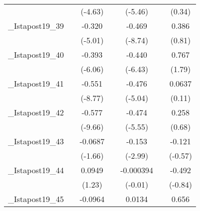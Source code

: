 {\begin{tabular}{l*{6}{c}}
            &                     &     (-4.63)         &                     &     (-5.46)         &                     &      (0.34)         \\
[1em]
\_Istapost19\_39&                     &      -0.320\sym{***}&                     &      -0.469\sym{***}&                     &       0.386         \\
            &                     &     (-5.01)         &                     &     (-8.74)         &                     &      (0.81)         \\
[1em]
\_Istapost19\_40&                     &      -0.393\sym{***}&                     &      -0.440\sym{***}&                     &       0.767         \\
            &                     &     (-6.06)         &                     &     (-6.43)         &                     &      (1.79)         \\
[1em]
\_Istapost19\_41&                     &      -0.551\sym{***}&                     &      -0.476\sym{***}&                     &      0.0637         \\
            &                     &     (-8.77)         &                     &     (-5.04)         &                     &      (0.11)         \\
[1em]
\_Istapost19\_42&                     &      -0.577\sym{***}&                     &      -0.474\sym{***}&                     &       0.258         \\
            &                     &     (-9.66)         &                     &     (-5.55)         &                     &      (0.68)         \\
[1em]
\_Istapost19\_43&                     &     -0.0687         &                     &      -0.153\sym{**} &                     &      -0.121         \\
            &                     &     (-1.66)         &                     &     (-2.99)         &                     &     (-0.57)         \\
[1em]
\_Istapost19\_44&                     &      0.0949         &                     &   -0.000394         &                     &      -0.492         \\
            &                     &      (1.23)         &                     &     (-0.01)         &                     &     (-0.84)         \\
[1em]
\_Istapost19\_45&                     &     -0.0964\sym{**} &                     &      0.0134         &                     &       0.656         \\

\end{tabular}}
